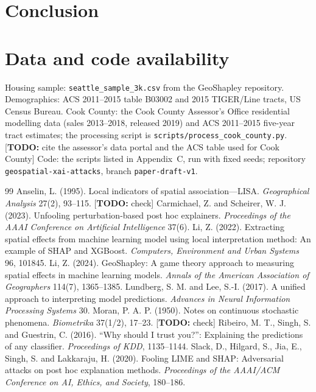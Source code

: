 \documentclass[11pt]{article}
\newcommand{\1}{\mathbf{1}}
\newcommand{\todo}[1]{\textcolor{red!70!black}{[\textbf{TODO:} #1]}}
\begin{document}
\section{Conclusion}


\section*{Data and code availability}
Housing sample: \texttt{seattle\_sample\_3k.csv} from the GeoShapley repository. Demographics: ACS 2011--2015 table
B03002 and 2015 TIGER/Line tracts, US Census Bureau. Cook County: the Cook County Assessor's Office residential
modelling data (sales 2013--2018, released 2019) and ACS 2011--2015 five-year tract estimates; the processing script
is \texttt{scripts/process\_cook\_county.py}. \todo{cite the assessor's data portal and the ACS table used for Cook
County} Code: the scripts listed in Appendix~C, run with fixed seeds;
repository \texttt{geospatial-xai-attacks}, branch \texttt{paper-draft-v1}.


\begin{thebibliography}{99}
 Anselin, L. (1995). Local indicators of spatial association---LISA.
  \emph{Geographical Analysis} 27(2), 93--115. \todo{check}
 Carmichael, Z. and Scheirer, W. J. (2023).
  Unfooling perturbation-based post hoc explainers. \emph{Proceedings of the AAAI Conference on Artificial
  Intelligence} 37(6).
 Li, Z. (2022). Extracting spatial effects from machine learning model using local
  interpretation method: An example of SHAP and XGBoost. \emph{Computers, Environment and Urban Systems} 96, 101845.
 Li, Z. (2024). GeoShapley: A game theory approach to measuring spatial effects
  in machine learning models. \emph{Annals of the American Association of Geographers} 114(7), 1365--1385.
 Lundberg, S. M. and Lee, S.-I. (2017). A unified approach to
  interpreting model predictions. \emph{Advances in Neural Information Processing Systems} 30.
 Moran, P. A. P. (1950). Notes on continuous stochastic phenomena.
  \emph{Biometrika} 37(1/2), 17--23. \todo{check}
 Ribeiro, M. T., Singh, S. and Guestrin, C. (2016). ``Why should I
  trust you?'': Explaining the predictions of any classifier. \emph{Proceedings of KDD}, 1135--1144.
 Slack, D., Hilgard, S., Jia, E., Singh, S. and Lakkaraju, H. (2020).
  Fooling LIME and SHAP: Adversarial attacks on post hoc explanation methods. \emph{Proceedings of the AAAI/ACM
  Conference on AI, Ethics, and Society}, 180--186.
\end{thebibliography}

\appendix

\end{document}
